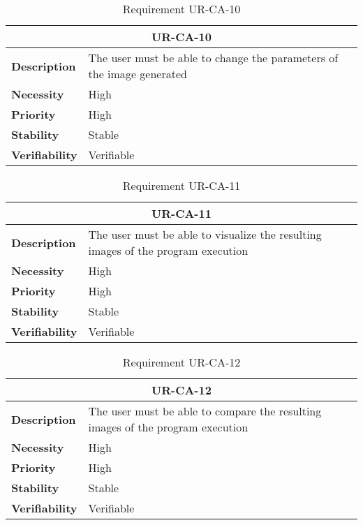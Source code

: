\begin{table}[H]
    \centering
    \begin{tabular}{l p{10cm}}
        \toprule
        \multicolumn{2}{c}{UR-CA-10} \\
        \toprule
        \textbf{Description}        & The user must be able to change the parameters of the image generated \\
        \textbf{Necessity}          & High   \\
        \textbf{Priority}           & High   \\
        \textbf{Stability}          & Stable \\
        \textbf{Verifiability}      & Verifiable \\
    \end{tabular}
    \caption{Requirement UR-CA-10}
    \label{tab:ur-ca-10}
\end{table}

\begin{table}[H]
    \centering
    \begin{tabular}{l p{10cm}}
        \toprule
        \multicolumn{2}{c}{UR-CA-11} \\
        \toprule
        \textbf{Description}        & The user must be able to visualize the resulting images of the program execution \\
        \textbf{Necessity}          & High   \\
        \textbf{Priority}           & High   \\
        \textbf{Stability}          & Stable \\
        \textbf{Verifiability}      & Verifiable \\
    \end{tabular}
    \caption{Requirement UR-CA-11}
    \label{tab:ur-ca-11}
\end{table}

\begin{table}[H]
    \centering
    \begin{tabular}{l p{10cm}}
        \toprule
        \multicolumn{2}{c}{UR-CA-12} \\
        \toprule
        \textbf{Description}        & The user must be able to compare the resulting images of the program execution \\
        \textbf{Necessity}          & High   \\
        \textbf{Priority}           & High   \\
        \textbf{Stability}          & Stable \\
        \textbf{Verifiability}      & Verifiable \\
    \end{tabular}
    \caption{Requirement UR-CA-12}
    \label{tab:ur-ca-12}
\end{table}

